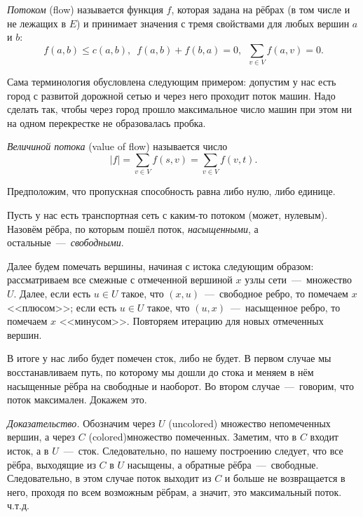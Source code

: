 \begin{definition}
	\emph{Потоком} (flow) называется функция $f$, которая задана на рёбрах (в том числе и не лежащих в $E$) и принимает значения с тремя свойствами для любых вершин $a$ и $b$: 
	$$f(a, b) \leqslant c(a, b), \;\ f(a, b) + f (b, a) = 0, \;\ \sum_{v \in V}f(a, v) = 0.$$
\end{definition}

	Сама терминология обусловлена следующим примером: допустим у нас есть город с развитой дорожной сетью и через него проходит поток машин. Надо сделать так, чтобы через город прошло максимальное число машин при этом ни на одном перекрестке не образовалась пробка.
	
\begin{definition}
	\emph{Величиной потока} (value of flow) называется число 
	$$|f| = \sum_{v \in V} f (s, v) = \sum_{v \in V} f (v, t).$$
\end{definition}

	
	Предположим, что пропускная способность равна либо нулю, либо единице.	
	
	Пусть у нас есть транспортная сеть с каким-то потоком (может, нулевым). Назовём рёбра, по которым пошёл поток, \emph{насыщенными}, а остальные~---~\emph{свободными}.
	
	Далее будем помечать вершины, начиная с истока следующим образом: рассматриваем все смежные с отмеченной вершиной $x$ узлы сети~---~множество $U$. Далее, если есть $u \in U$ такое, что $(x, u)$~---~свободное ребро, то помечаем $x$ <<плюсом>>; если есть $u \in U$ такое, что $(u, x)$~---~насыщенное ребро, то помечаем $x$ <<минусом>>. Повторяем итерацию для новых отмеченных вершин. 
	
	В итоге у нас либо будет помечен сток, либо не будет. В первом случае мы восстанавливаем путь, по которому мы дошли до стока и меняем в нём насыщенные рёбра на свободные и наоборот. Во втором случае~---~говорим, что поток максимален. Докажем это.
	
	\emph{Доказательство.} Обозначим через $U$ (uncolored) множество непомеченных вершин, а через $C$ (colored)множество помеченных. Заметим, что в $C$ входит исток, а в $U$~---~сток. Следовательно, по нашему построению следует, что все рёбра, выходящие из $C$ в $U$ насыщены, а обратные рёбра~---~свободные. Следовательно, в этом случае поток выходит из $C$ и больше не возвращается в него, проходя по всем возможным рёбрам, а значит, это максимальный поток. ч.т.д.
	
